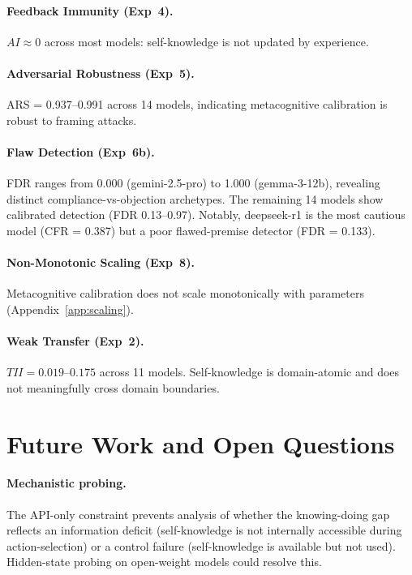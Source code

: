 \documentclass[10pt]{article}
\newcommand{\ARS}{ARS}
\newcommand{\CFR}{CFR}
\newcommand{\FDR}{FDR}
\newcommand{\TII}{TII}
\newcommand{\AI}{AI}
\begin{document}
\paragraph{Feedback Immunity (Exp~4).}
$\AI{} \approx 0$ across most models: self-knowledge is not updated by experience.

\paragraph{Adversarial Robustness (Exp~5).}
\ARS{} = 0.937--0.991 across 14 models, indicating metacognitive calibration is robust to framing attacks.

\paragraph{Flaw Detection (Exp~6b).}
\FDR{} ranges from 0.000 (gemini-2.5-pro) to 1.000 (gemma-3-12b), revealing distinct compliance-vs-objection archetypes. The remaining 14 models show calibrated detection (\FDR{} 0.13--0.97). Notably, deepseek-r1 is the most cautious model (\CFR{} = 0.387) but a poor flawed-premise detector (\FDR{} = 0.133).

\paragraph{Non-Monotonic Scaling (Exp~8).}
Metacognitive calibration does not scale monotonically with parameters (Appendix~\ref{app:scaling}).

\paragraph{Weak Transfer (Exp~2).}
$\TII{} = 0.019$--$0.175$ across 11 models. Self-knowledge is domain-atomic and does not meaningfully cross domain boundaries.

\section{Future Work and Open Questions}
\label{app:future}

\paragraph{Mechanistic probing.}
The API-only constraint prevents analysis of whether the knowing-doing gap reflects an information deficit (self-knowledge is not internally accessible during action-selection) or a control failure (self-knowledge is available but not used). Hidden-state probing on open-weight models could resolve this.
\end{document}
